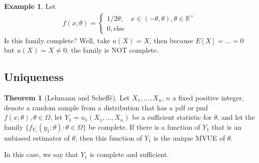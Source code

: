 \documentclass{book}
\theoremstyle{definition}
\newtheorem{thm}{Theorem}[section]
\newtheorem{exmp}{Example}[section]
\newcommand{\Else}{\text{else}}
\begin{document}
\begin{exmp}
	Let 
	\begin{align}
	f(x;\theta) = \begin{cases}
	1/2\theta, \quad x\in (-\theta,\theta), \theta \in \mathbb{R}^+\\
	0, \Else
	\end{cases}
	\end{align}
	Is this family complete? Well, take $u(X) = X$, then because $E[X] = \dots = 0$ but $u(X) = X \neq 0$, the family is NOT complete. 
	
\end{exmp}












\subsection{Uniqueness}


\begin{thm}[Lehmann and Scheff\'e]
	Let $X_1,\dots,X_n$, $n$ a fixed positive integer, denote a random sample from a distribution that has a pdf or pmf $f(x;\theta), \theta \in \Omega$, let $Y_1 = u_1(X_1,\dots,X_n)$ be a sufficient statistic for $\theta$, and let the family $\{ f_{Y_1}(y_1;\theta) : \theta \in \Omega \}$ be complete. If there is a function of $Y_1$ that is an unbiased estimator of $\theta$, then this function of $Y_1$ is the unique MVUE of $\theta$.
\end{thm}


In this case, we say that $Y_1$ is complete and sufficient. 
\end{document}
